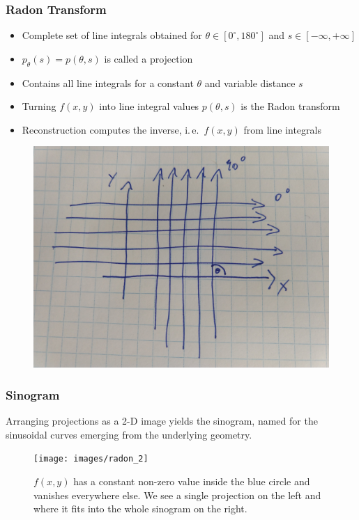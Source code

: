 \begin{frame}
	\frametitle{Radon Transform}

	\begin{itemize}
		\setlength\itemsep{0.3cm}
		\item Complete set of line integrals obtained for $\theta \in [0^\circ, 180^\circ]$ and $s \in [-\infty, +\infty]$
		\item $p_{\theta}(s) = p(\theta,s)$ is called a projection
		\item Contains all line integrals for a constant $\theta$ and variable distance $s$
		\item Turning $f(x,y)$ into line integral values $p(\theta, s)$ is the Radon transform
		\item Reconstruction computes the inverse, i.\,e.~$f(x,y)$ from line integrals
	\end{itemize}

	\begin{figure}[tbp]
		\centering
		\includegraphics[height=0.4\textheight]{images/radon2_rotation}%
		\label{fig:ct_radon2_rotation}
	\end{figure}
	
\end{frame}

\begin{frame}
	\frametitle{Sinogram}

	Arranging projections as a 2-D image yields the sinogram, named for the sinusoidal curves emerging from the underlying geometry.

	\begin{figure}[tbp]
		\centering
		\texttt{[image: images/radon\_2]}
		\caption{$f(x, y)$ has a constant non-zero value inside the blue circle and vanishes everywhere else. We see a single projection on the left and where it fits into the whole sinogram on the right.}%
		\label{fig:ct_radon_2}
	\end{figure}

\end{frame}


